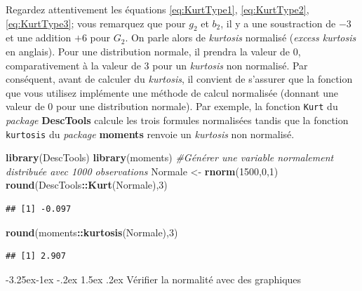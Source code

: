 \documentclass[
  11pt,
  french,
]{book}
\makeatletter
\newenvironment{Shaded}{\begin{snugshade}}{\end{snugshade}}
\newcommand{\CommentTok}[1]{\textcolor[rgb]{0.56,0.35,0.01}{\textit{#1}}}
\newcommand{\DecValTok}[1]{\textcolor[rgb]{0.00,0.00,0.81}{#1}}
\newcommand{\KeywordTok}[1]{\textcolor[rgb]{0.13,0.29,0.53}{\textbf{#1}}}
\newcommand{\NormalTok}[1]{#1}
\newcommand{\OperatorTok}[1]{\textcolor[rgb]{0.81,0.36,0.00}{\textbf{#1}}}
\newcommand{\StringTok}[1]{\textcolor[rgb]{0.31,0.60,0.02}{#1}}
\newenvironment{kframe}{%
\medskip{}
\setlength{\fboxsep}{.8em}
 \def\at@end@of@kframe{}%
 \ifinner\ifhmode%
  \def\at@end@of@kframe{\end{minipage}}%
  \begin{minipage}{\columnwidth}%
 \fi\fi%
 \def\FrameCommand##1{\hskip\@totalleftmargin \hskip-\fboxsep
 \colorbox{shadecolor}{##1}\hskip-\fboxsep
     \hskip-\linewidth \hskip-\@totalleftmargin \hskip\columnwidth}%
 \MakeFramed {\advance\hsize-\width
   \@totalleftmargin\z@ \linewidth\hsize
   \@setminipage}}%
 {\par\unskip\endMakeFramed%
 \at@end@of@kframe}
\newenvironment{kframev}{%
\medskip{}
\setlength{\fboxsep}{.8em}
 \def\at@end@of@kframev{}%
 \ifinner\ifhmode%
  \def\at@end@of@kframev{\end{minipage}}%
  \begin{minipage}{\columnwidth}%
 \fi\fi%
 \def\FrameCommand##1{\hskip\@totalleftmargin \hskip-\fboxsep
 \colorbox{shadebluecolor}{##1}\hskip-\fboxsep
     \hskip-\linewidth \hskip-\@totalleftmargin \hskip\columnwidth}%
 \MakeFramed {\advance\hsize-\width
   \@totalleftmargin\z@ \linewidth\hsize
   \@setminipage}}%
 {\par\unskip\endMakeFramed%
 \at@end@of@kframev}
\renewenvironment{Shaded}{\begin{kframe}}{\end{kframe}}
\newenvironment{rmdblock}[1]
  {
  \begin{itemize}
  \renewcommand{\labelitemi}{
    \raisebox{-.7\height}[0pt][0pt]{
      {\setkeys{Gin}{width=3em,keepaspectratio}\texttt{[image: images/\#1]}}
    }
  }
  \setlength{\fboxsep}{1em}
  \begin{kframev}
  \small
  \item
  }
  {
  \end{kframev}
  \end{itemize}
  }
\newenvironment{bloc_attention}
  {\begin{rmdblock}{attention}}
  {\end{rmdblock}}
\renewcommand\paragraph{\@startsection{paragraph}{4}{\z@}%
   {-3.25ex\@plus -1ex \@minus -.2ex}%
   {1.5ex \@plus .2ex}%
   {\normalfont\normalsize\bfseries}}
\makeatother
\begin{document}
\begin{bloc_attention}

Regardez attentivement les équations \eqref{eq:KurtType1}, \eqref{eq:KurtType2}, \eqref{eq:KurtType3}; vous remarquez que pour \(g_2\) et \(b_2\), il y a une soustraction de \(-3\) et une addition \(+6\) pour \(G_2\). On parle alors de \emph{kurtosis} normalisé (\emph{excess kurtosis} en anglais). Pour une distribution normale, il prendra la valeur de 0, comparativement à la valeur de 3 pour un \emph{kurtosis} non normalisé. Par conséquent, avant de calculer du \emph{kurtosis}, il convient de s'assurer que la fonction que vous utilisez implémente une méthode de calcul normalisée (donnant une valeur de 0 pour une distribution normale). Par exemple, la fonction \texttt{Kurt} du \emph{package} \textbf{DescTools} calcule les trois formules normalisées tandis que la fonction \texttt{kurtosis} du \emph{package} \textbf{moments} renvoie un \emph{kurtosis} non normalisé.

\begin{Shaded}
\begin{Highlighting}[]
\KeywordTok{library}\NormalTok{(DescTools)}
\KeywordTok{library}\NormalTok{(moments)}
\CommentTok{#Générer une variable normalement distribuée avec 1000 observations}
\NormalTok{Normale <-}\StringTok{ }\KeywordTok{rnorm}\NormalTok{(}\DecValTok{1500}\NormalTok{,}\DecValTok{0}\NormalTok{,}\DecValTok{1}\NormalTok{)}
\KeywordTok{round}\NormalTok{(DescTools}\OperatorTok{::}\KeywordTok{Kurt}\NormalTok{(Normale),}\DecValTok{3}\NormalTok{)}
\end{Highlighting}
\end{Shaded}

\begin{verbatim}
## [1] -0.097
\end{verbatim}

\begin{Shaded}
\begin{Highlighting}[]
\KeywordTok{round}\NormalTok{(moments}\OperatorTok{::}\KeywordTok{kurtosis}\NormalTok{(Normale),}\DecValTok{3}\NormalTok{)}
\end{Highlighting}
\end{Shaded}

\begin{verbatim}
## [1] 2.907
\end{verbatim}


\end{bloc_attention}

\hypertarget{vuxe9rifier-la-normalituxe9-avec-des-graphiques}{%
\paragraph{Vérifier la normalité avec des graphiques}\label{vuxe9rifier-la-normalituxe9-avec-des-graphiques}}
\end{document}
